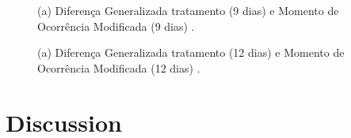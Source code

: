 \documentclass[journal,article,submit,moreauthors,pdftex,10pt,a4paper]{mdpi}
\theoremstyle{mdpi}
\newcounter{re}
\theoremstyle{mdpidefinition}
\begin{document}
\begin{figure}[!htb]
\centering
{}
\qquad
{}
\caption{(a) Diferença Generalizada tratamento (9 dias) e Momento de Ocorrência Modificada (9 dias) .}
\label{atividades4}
\end{figure}

\begin{figure}[!htb]
\centering
{}
\qquad
{}
\caption{(a) Diferença Generalizada tratamento (12 dias) e Momento de Ocorrência Modificada (12 dias) .}
\label{atividades5}
\end{figure}

\newpage

\section{Discussion}
\end{document}
